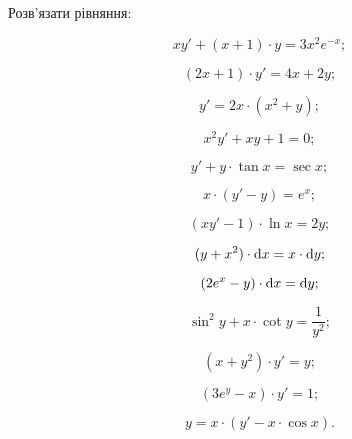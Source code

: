 Розв’язати рівняння:
\begin{multicols}{2}
\begin{problem}
	\[x y' + (x + 1) \cdot y = 3 x^2 e^{-x};\]
\end{problem}
\begin{problem}
	\[(2x + 1) \cdot y' =4x+2y;\]
\end{problem}
\begin{problem}
	\[y'=2x\cdot(x^2+y);\]
\end{problem}
\begin{problem}
	\[x^2y'+xy+1=0;\]
\end{problem}
\begin{problem}
	\[y'+y\cdot\tan x=\sec x;\]
\end{problem}
\begin{problem}
	\[x\cdot(y'-y)=e^x;\]
\end{problem}
\begin{problem}
	\[(xy'-1)\cdot\ln x=2y;\]
\end{problem}
\begin{problem}
	\[(y+x^2)\cdot \mathop{}\!\mathrm{d} x=x \cdot\mathop{}\!\mathrm{d} y;\]
\end{problem}
\begin{problem}
	\[(2e^x-y)\cdot\mathop{}\!\mathrm{d} x=\mathop{}\!\mathrm{d} y;\]
\end{problem}
\begin{problem}
	\[\sin^2 y + x \cdot \cot y = \frac1{y^2};\]
\end{problem}
\begin{problem}
	\[(x+y^2)\cdot y'=y;\]
\end{problem}
\begin{problem}
	\[(3e^y-x)\cdot y' = 1;\]
\end{problem}
\begin{problem}
	\[y = x\cdot(y'- x \cdot \cos x).\]
\end{problem}
\end{multicols}

